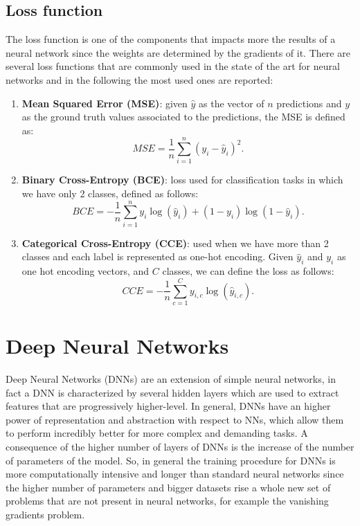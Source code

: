 \documentclass[binding=0.6cm,noexaminfo]{sapthesis}
\begin{document}
\subsection{Loss function}
The loss function is one of the components that impacts more the results of a neural network since the weights are determined by the gradients of it. There are several loss functions that are commonly used in the state of the art for neural networks and in the following the most used ones are reported:
\begin{enumerate}
\item \textbf{Mean Squared Error (MSE)}: given $\hat{y}$ as the vector of $n$ predictions and $y$ as the ground truth values associated to the predictions, the MSE is defined as:
\begin{equation}
MSE = \frac{1}{n} \sum_{i=1}^n (y_i - \hat{y}_i)^2.
\end{equation}
\item \textbf{Binary Cross-Entropy (BCE)}: loss used for classification tasks in which we have only 2 classes, defined as follows:
\begin{equation}
BCE = - \frac{1}{n} \sum_{i=1}^n y_i \log (\hat{y}_i) + (1 - y_i) \log (1 - \hat{y}_i).
\end{equation}
\item \textbf{Categorical Cross-Entropy (CCE)}: used when we have more than 2 classes and each label is represented as one-hot encoding. Given $\hat{y}_i$ and $y_i$ as one hot encoding vectors, and $C$ classes, we can define the loss as follows:
\begin{equation}
CCE = - \frac{1}{n} \sum_{c=1}^C y_{i, c} \log (\hat{y}_{i, c}).
\end{equation}
\end{enumerate}

\section{Deep Neural Networks}\label{sec:dnn}

Deep Neural Networks (DNNs) are an extension of simple neural networks, in fact a DNN is characterized by several hidden layers which are used to extract features that are progressively higher-level. In general, DNNs have an higher power of representation and abstraction with respect to NNs, which allow them to perform incredibly better for more complex and demanding tasks.
A consequence of the higher number of layers of DNNs is the increase of the number of parameters of the model. So, in general the training procedure for DNNs is more computationally intensive and longer than standard neural networks since the higher number of parameters and bigger datasets rise a whole new set of problems that are not present in neural networks, for example the vanishing gradients problem.
\end{document}

